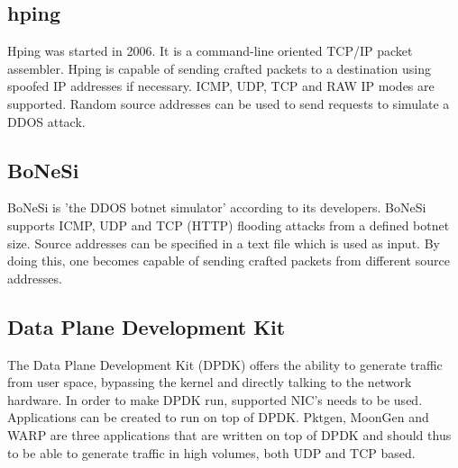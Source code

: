 \subsection{hping}\label{sub:hping}
Hping was started in 2006. It is a command-line oriented TCP/IP packet assembler. Hping is capable of sending crafted packets to a destination using spoofed IP addresses if necessary. ICMP, UDP, TCP and RAW IP modes are supported. Random source addresses can be used to send requests to simulate a DDOS attack.    

\subsection{BoNeSi}\label{sub:bonesi}
BoNeSi is 'the DDOS botnet simulator' according to its developers. BoNeSi supports ICMP, UDP and TCP (HTTP) flooding attacks from a defined botnet size. Source addresses can be specified in a text file which is used as input. By doing this, one becomes capable of sending crafted packets from different source addresses.  


\subsection{Data Plane Development Kit}\label{sub:dpdk}
The Data Plane Development Kit\cite{dpdk} (DPDK) offers the ability to generate traffic from user space, bypassing the kernel and directly talking to the network hardware. In order to make DPDK run, supported NIC's \cite{dpdknic} needs to be used. Applications can be created to run on top of DPDK. Pktgen, MoonGen and WARP are three applications that are written on top of DPDK and should thus to be able to generate traffic in high volumes, both UDP and TCP based. 

